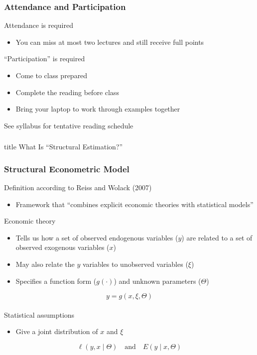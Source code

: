 \documentclass{beamer}
\begin{document}
\begin{frame}\frametitle{Attendance and Participation}
    Attendance is required
    \begin{itemize}
        \item You can miss at most two lectures and still receive full points
    \end{itemize}
    \vspace{3ex}
    ``Participation'' is required
    \begin{itemize}
        \item Come to class prepared
        \item Complete the reading before class
        \item Bring your laptop to work through examples together
    \end{itemize}
    \vspace{3ex}
    See syllabus for tentative reading schedule
\end{frame}

\begin{frame}\frametitle{}
    \vfill
    \centering
    \begin{beamercolorbox}[center]{title}
        \Large What Is ``Structural Estimation?''
    \end{beamercolorbox}
    \vfill
\end{frame}

\begin{frame}\frametitle{Structural Econometric Model}
    Definition according to Reiss and Wolack (2007)
    \begin{itemize}
        \item Framework that ``combines explicit economic theories with statistical models''
    \end{itemize}
    \vspace{1ex}
    Economic theory
    \begin{itemize}
        \item Tells us how a set of observed endogenous variables ($y$) are related to a set of observed exogenous variables ($x$)
        \item May also relate the $y$ variables to unobserved variables ($\xi$)
        \item Specifies a function form ($g(\cdot)$) and unknown parameters ($\Theta$)
    \end{itemize}
    \vspace{1ex}
    $$y = g(x, \xi, \Theta)$$ \\
    \vspace{1ex}
    Statistical assumptions
    \begin{itemize}
        \item Give a joint distribution of $x$ and $\xi$
    \end{itemize}
    \vspace{1ex}
    $$\ell(y, x \mid \Theta) \quad \text{and} \quad E(y \mid x, \Theta)$$
\end{frame}
\end{document}
